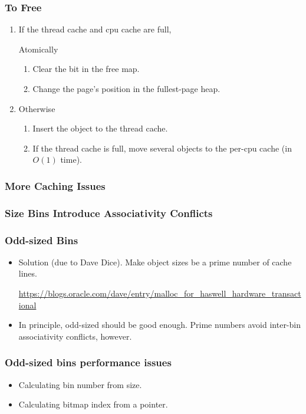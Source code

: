 \documentclass[xcolor=dvipsnames,14pt]{beamer}
\begin{document}
\begin{frame}
\frametitle{To Free}
\begin{enumerate}
\item If the thread cache and cpu cache are full, 

 Atomically
 \begin{enumerate}
 \item Clear the bit in the free map.
 \item Change the page's position in the fullest-page heap.
 \end{enumerate}
\item Otherwise 
 \begin{enumerate}
 \item Insert the object to the thread cache.
 \item If the thread cache is full, move several objects to the per-cpu cache (in $O(1)$ time).
 \end{enumerate}
\end{enumerate}
\end{frame}

\begin{frame}
\frametitle{More Caching Issues}
\end{frame}


\begin{frame}[fragile]
\frametitle{Size Bins Introduce Associativity Conflicts}

\end{frame}

\begin{frame}
\frametitle{Odd-sized Bins}

\begin{itemize}
\item Solution (due to Dave Dice).  Make object sizes be a prime number of cache lines.

\url{https://blogs.oracle.com/dave/entry/malloc_for_haswell_hardware_transactional}

\item In principle, odd-sized should be good enough.  Prime numbers avoid inter-bin associativity conflicts, however.
\end{itemize}

\end{frame}

\begin{frame}
\frametitle{Odd-sized bins performance issues}

\begin{itemize}
\item Calculating bin number from size.
\item Calculating bitmap index from a pointer.
\end{itemize}
\end{frame}
\end{document}
